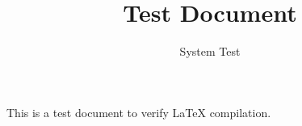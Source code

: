 \documentclass{article}
\begin{document}
\title{Test Document}
\author{System Test}
\maketitle
This is a test document to verify LaTeX compilation.
\end{document}
